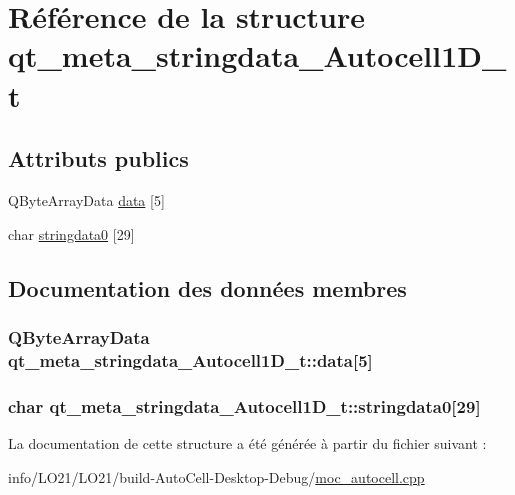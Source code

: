 \hypertarget{structqt__meta__stringdata___autocell1_d__t}{}\section{Référence de la structure qt\+\_\+meta\+\_\+stringdata\+\_\+\+Autocell1\+D\+\_\+t}
\label{structqt__meta__stringdata___autocell1_d__t}
\subsection*{Attributs publics}
\begin{DoxyCompactItemize}
\item 
Q\+Byte\+Array\+Data \hyperlink{structqt__meta__stringdata___autocell1_d__t_ad3d50b47a705a24ada7c255ddd8c526b}{data} \mbox{[}5\mbox{]}
\item 
char \hyperlink{structqt__meta__stringdata___autocell1_d__t_aa63fa3b230b4bd59751df0a366afe39f}{stringdata0} \mbox{[}29\mbox{]}
\end{DoxyCompactItemize}


\subsection{Documentation des données membres}
\subsubsection[{\texorpdfstring{data}{data}}]{\setlength{\rightskip}{0pt plus 5cm}Q\+Byte\+Array\+Data qt\+\_\+meta\+\_\+stringdata\+\_\+\+Autocell1\+D\+\_\+t\+::data\mbox{[}5\mbox{]}}\hypertarget{structqt__meta__stringdata___autocell1_d__t_ad3d50b47a705a24ada7c255ddd8c526b}{}\label{structqt__meta__stringdata___autocell1_d__t_ad3d50b47a705a24ada7c255ddd8c526b}
\subsubsection[{\texorpdfstring{stringdata0}{stringdata0}}]{\setlength{\rightskip}{0pt plus 5cm}char qt\+\_\+meta\+\_\+stringdata\+\_\+\+Autocell1\+D\+\_\+t\+::stringdata0\mbox{[}29\mbox{]}}\hypertarget{structqt__meta__stringdata___autocell1_d__t_aa63fa3b230b4bd59751df0a366afe39f}{}\label{structqt__meta__stringdata___autocell1_d__t_aa63fa3b230b4bd59751df0a366afe39f}


La documentation de cette structure a été générée à partir du fichier suivant \+:\begin{DoxyCompactItemize}
\item 
info/\+L\+O21/\+L\+O21/build-\/\+Auto\+Cell-\/\+Desktop-\/\+Debug/\hyperlink{moc__autocell_8cpp}{moc\+\_\+autocell.\+cpp}\end{DoxyCompactItemize}
